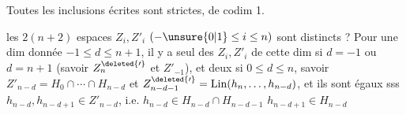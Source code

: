 Toutes les inclusions écrites sont strictes, de codim 1.

 les $2(n+2)$ espaces $Z_i,Z'_i$ $( -\unsure{0|1}\le i\le n)$ sont distincts ?  Pour une dim donnée $-1\le d\le n+1$, il y a    seul des $Z_i,Z'_i$ de cette dim si $d=-1$ ou $d=n+1$ (savoir $Z_n^{\deleted{\prime}}$ et $Z'_{-1}$), et  deux si $0\le d\le n$, savoir $Z'_{n-d}=H_0\cap\cdots\cap H_{n-d}$  et $Z_{n-d-1}^{\deleted{\prime}}=\mathrm{Lin}(h_n,\ldots,h_{n-d})$,  et ils  sont égaux sss $h_{n-d},h_{n-d+1}\in Z'_{n-d}$, i.e. $h_{n-d}\in H_{n-d}\cap H_{n-d-1}$ $h_{n-d+1}\in H_{n-d}$

